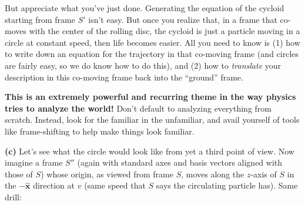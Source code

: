 \documentclass[12pt]{article}
\newcommand{\unx}{\hat{\mathbf{x}}}
\begin{document}
But appreciate what you’ve just done. Generating the equation of the cycloid starting from frame \(S'\) isn’t easy. But once you realize that, in a frame that co-moves with the center of the rolling disc, the cycloid is just a particle moving in a circle at constant speed, then life becomes easier. All you need to know is (1) how to write down an equation for the trajectory in that co-moving frame (and circles are fairly easy, so we do know how to do this), and (2) how to \textit{translate} your description in this co-moving frame back into the “ground” frame.

\textbf{This is an extremely powerful and recurring theme in the way physics tries to analyze the world!} Don’t default to analyzing everything from scratch. Instead, look for the familiar in the unfamiliar, and avail yourself of tools like frame-shifting to help make things look familiar.

\textbf{(c)} Let’s see what the circle would look like from yet a third point of view. Now imagine a frame \(S''\) (again with standard axes and basis vectors aligned with those of \(S\)) whose origin, as viewed from frame \(S\), moves along the \(z\)-axis of \(S\) in the \(-\unx\) direction at \(v\) (same speed that \(S\) says the circulating particle has). Same drill:
\end{document}
